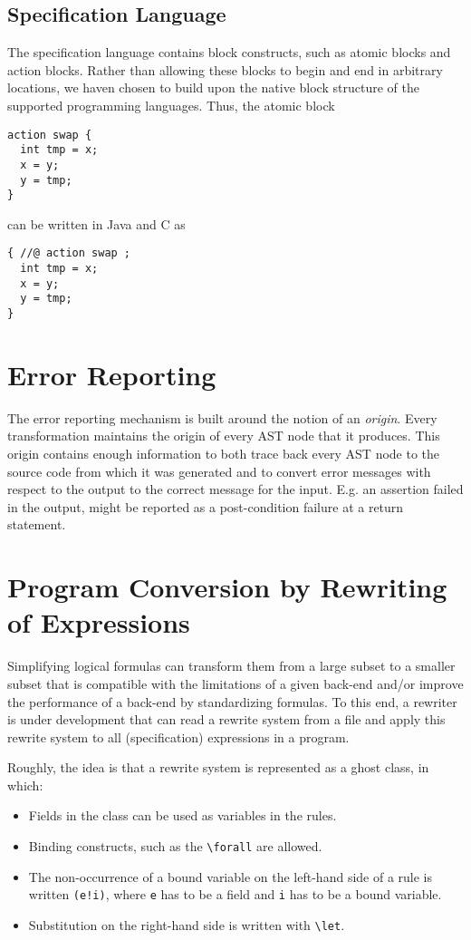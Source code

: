 \documentclass{report}
\begin{document}
\section{Specification Language}

The specification language contains block constructs, such as atomic blocks and action blocks.
Rather than allowing these blocks to begin and end in arbitrary locations, we haven chosen to
build upon the native block structure of the supported programming languages. Thus, the atomic
block
\begin{lstlisting}
action swap {
  int tmp = x;
  x = y;
  y = tmp; 
}
\end{lstlisting}
can be written in Java and C as
\begin{lstlisting}
{ //@ action swap ;
  int tmp = x;
  x = y;
  y = tmp; 
}
\end{lstlisting}

\chapter{Error Reporting}

The error reporting mechanism is built around the notion of an \emph{origin}.
Every transformation maintains the origin of every AST node that it produces.
This origin contains enough information to both trace back every AST node
to the source code from which it was generated and to convert error
messages with respect to the output to the correct message for the input.
E.g. an assertion failed in the output, might be reported as a
post-condition failure at a return statement.



\chapter{Program Conversion by Rewriting of Expressions}

Simplifying logical formulas can transform them from a large subset to
a smaller subset that is compatible with the limitations of a given back-end
and/or improve the performance of a back-end by standardizing formulas.
To this end, a rewriter is under development that can read a rewrite system
from a file and apply this rewrite system to all (specification) expressions
in a program.

Roughly, the idea is that a rewrite system is represented as a ghost class,
in which:
\begin{itemize}
\item Fields in the class can be used as variables in the rules.
\item Binding constructs, such as the \lstinline+\forall+ are allowed.
\item The non-occurrence of a bound variable on the left-hand side of a rule
is written \lstinline+(e!i)+, where \lstinline+e+ has to be a field and
\lstinline+i+ has to be a bound variable.
\item Substitution on the right-hand side is written with \lstinline+\let+.
\end{itemize}
\end{document}
